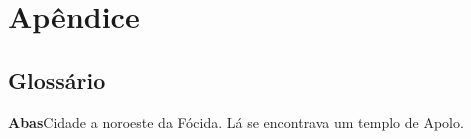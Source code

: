 \part{Apêndice} 










\chapter{Glossário}

\begingroup
\parskip3pt
\parindent0pt

\textbf{Abas}\quad Cidade a noroeste da Fócida. Lá se encontrava um
templo de Apolo.

